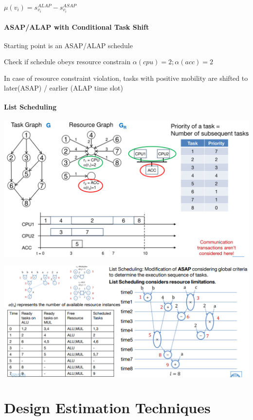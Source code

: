 \documentclass[english]{latex4ei/latex4ei_sheet}
\begin{document}
$\mu(v_i) = s_{v_i}^{ALAP} - s_{v_i}^{ASAP}$

\paragraph{ASAP/ALAP with Conditional Task Shift}
Starting point is an ASAP/ALAP schedule

Check if schedule obeys resource constrain $\alpha(cpu) = 2; \alpha(acc) = 2$ 

In case of resource constraint violation, tasks with positive mobility are shifted to later(ASAP) / earlier (ALAP time slot)

\paragraph{List Scheduling} 


\begin{center}
  \includegraphics[width=0.8\linewidth]{assets/ListSchedulingExample.png}
  \label{fig:listschedulingexample}
\end{center}

\begin{center}
  \centering
  \includegraphics[width=0.8\linewidth]{assets/ListSchedulingTut.png}
  \label{fig:listschedulingtut}
\end{center}

\section{Design Estimation Techniques}
\end{document}

